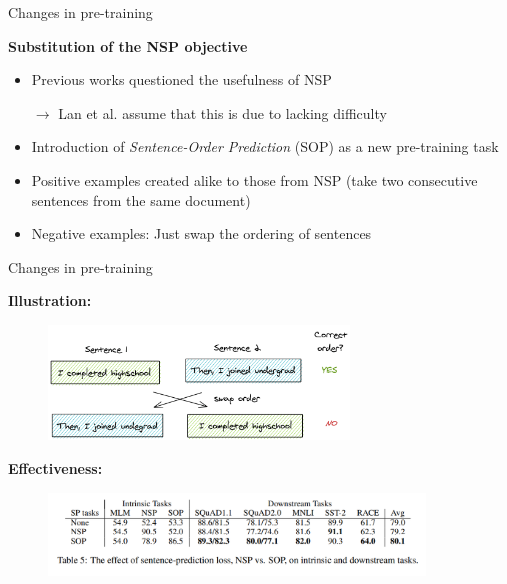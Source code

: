 
\begin{frame}{Changes in pre-training}

\vfill

	\textbf{Substitution of the NSP objective}
		
	\begin{itemize}
			\item Previous works questioned the usefulness of NSP
			\item[$\to$] Lan et al. assume that this is due to lacking difficulty
			\item Introduction of \textit{Sentence-Order Prediction} (SOP) as a new pre-training task
			\item Positive examples created alike to those from NSP (take two consecutive sentences from the same document)
			\item Negative examples: Just swap the ordering of sentences
	\end{itemize}

\vfill

\end{frame}


\begin{frame}{Changes in pre-training}

\vfill

	\textbf{Illustration:}
		
	\begin{figure}
		\centering
		\includegraphics[width = 8cm]{figure/albert-sop.png}\\ 
	\end{figure}

	\textbf{Effectiveness:}
		
	\begin{figure}
		\centering
		\includegraphics[width = 10cm]{figure/albert-sop-ablation.png}\\ 
	\end{figure}

\vfill

\end{frame}

